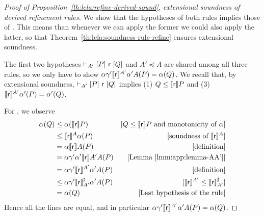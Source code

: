 \begin{proof}[Proof of Proposition~\ref{th:lcla:refine-derived-sound}, extensional soundness of derived refinement rules]
	We show that the hypotheses of both rules implies those of . This means than whenever we can apply the former we could also apply the latter, so that Theorem~\ref{th:lcla:soundness-rule-refine} ensures extensional soundness.

	The first two hypotheses $\vdash_{A'}\nobreak[P]~\mathsf{r}~[Q]$ and $A' \preceq A$ are shared among all three rules, so we only have to show $\alpha \gamma' \llbracket\mathsf{r}\rrbracket^{A'} \alpha' A(P) = \alpha(Q)$. We recall that, by extensional soundness, $\vdash_{A'}\nobreak[P]~\mathsf{r}~[Q]$ implies (1) $Q \le \llbracket\mathsf{r}\rrbracket P$ and (3) $\llbracket\mathsf{r}\rrbracket^{A'} \alpha'(P) = \alpha'(Q)$.

	For , we observe
	\begin{align*}
		\alpha(Q) & \le \alpha(\llbracket\mathsf{r}\rrbracket P )                                & [Q \le \llbracket\mathsf{r}\rrbracket P \text{ and monotonicity of }\alpha] \\
		          & \le \llbracket\mathsf{r}\rrbracket^{A} \alpha(P)                             & [\text{soundness of }\llbracket\mathsf{r}\rrbracket^{A}]                    \\
		          & = \alpha \llbracket\mathsf{r}\rrbracket A(P)                                 & [\text{definition}]                                        \\
		          & = \alpha \gamma' \alpha' \llbracket\mathsf{r}\rrbracket A' A(P)              & [\text{Lemma~\ref{lmm:app:lemma-AA'}}]                     \\
		          & = \alpha \gamma' \llbracket\mathsf{r}\rrbracket^{A'} \alpha' A(P)            & [\text{definition}]                                        \\
		          & \le \alpha \gamma' \llbracket\mathsf{r}\rrbracket^{\sharp}_{A'} \alpha' A(P) & [\llbracket\mathsf{r}\rrbracket^{A'} \le \llbracket\mathsf{r}\rrbracket^{\sharp}_{A'}]       \\
		          & = \alpha(Q)                                                 & [\text{Last hypothesis of the rule}]
	\end{align*}
	Hence all the lines are equal, and in particular $\alpha \gamma' \llbracket\mathsf{r}\rrbracket^{A'} \alpha' A(P) = \alpha(Q)$.


\end{proof}
